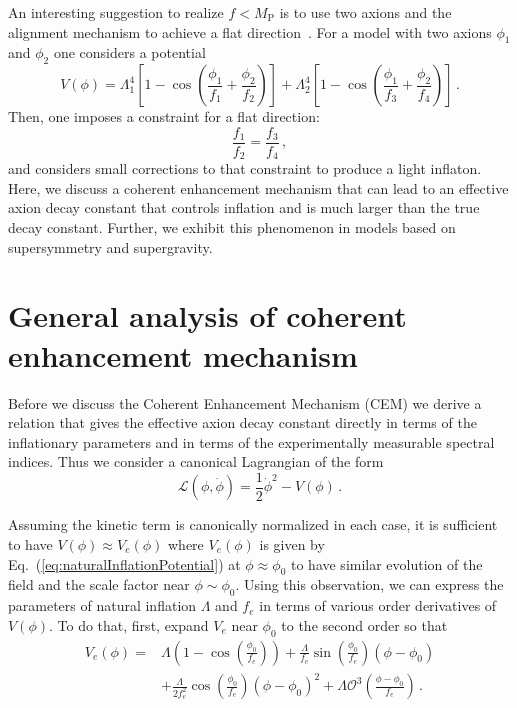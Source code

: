 \documentclass[12pt]{article}
\begin{document}
An interesting suggestion to realize $f < M_\text{P}$ is to use two axions and the alignment mechanism to achieve a flat direction~\cite{Long:2014dta}.
For a model with two axions $\phi_1$ and $\phi_2$ one considers a potential
\begin{equation} \label{eq:alignmentPotential}
  V(\phi)
    = \Lambda^4_1 \left[1 - \cos\left(\frac{\phi_1}{f_1} + \frac{\phi_2}{f_2}\right)\right]
    + \Lambda^4_2 \left[1 - \cos\left(\frac{\phi_1}{f_3} + \frac{\phi_2}{f_4}\right)\right]\,.
\end{equation}
Then, one imposes a constraint for a flat direction:
\begin{equation} \label{eq:alignmentConstraint}
  \frac{f_1}{f_2} = \frac{f_3}{f_4}\,,
\end{equation}
and considers small corrections to that constraint to produce a light inflaton.
Here, we discuss a coherent enhancement mechanism that can lead to an effective axion decay constant that controls inflation and is much larger than the true decay constant.
Further, we exhibit this phenomenon in models based on supersymmetry and supergravity.

\section{General analysis of coherent enhancement mechanism \label{sec:CoherentEnhancement}}
Before we discuss the Coherent Enhancement Mechanism (CEM) we derive a relation that gives the effective axion decay constant directly in terms of the inflationary parameters and in terms of the experimentally measurable spectral indices.
Thus we consider a canonical Lagrangian of the form
\begin{equation}
  \mathcal{L}\left(\phi, \dot{\phi}\right) = \frac{1}{2}{\dot{\phi}}^2 - V\left(\phi\right)\,.
\end{equation}

Assuming the kinetic term is canonically normalized in each case, it is sufficient to have $V\left(\phi\right) \approx V_{e}\left(\phi\right)$ where $V_{e}\left(\phi\right)$ is given by Eq.~(\ref{eq:naturalInflationPotential}) at $\phi \approx \phi_0$ to have similar evolution of the field and the scale factor near $\phi \sim \phi_0$.
Using this observation, we can express the parameters of natural inflation $\Lambda$ and $f_e$ in terms of various order derivatives of $V\left(\phi\right)$.
To do that, first, expand $V_{e}$ near $\phi_0$ to the second order so that
\begin{equation} \label{eq:naturalInflationSeries}
  \begin{aligned}
    V_{e}\left(\phi\right) =
      &\Lambda \left(1 - \cos\left(\frac{\phi_0}{f_e}\right)\right)
        + \frac{\Lambda}{f_e} \sin\left(\frac{\phi_0}{f_e}\right) \left(\phi - \phi_0\right)\\
      & + \frac{\Lambda}{2 f_e^2} \cos\left(\frac{\phi_0}{f_e}\right) \left(\phi - \phi_0\right)^2
        + \Lambda \mathcal{O}^3\left(\frac{\phi - \phi_0}{f_e}\right)\,.
  \end{aligned}
\end{equation}
\end{document}
